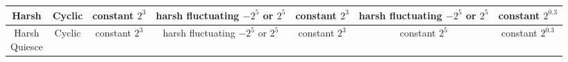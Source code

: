 \documentclass[PhD]{msu-thesis}
\begin{document}
\begin{table}[]
\begin{tabular}{|c|c||c|c||c|c|c|}
	Harsh & Cyclic & \makecell{constant \\ $2^3$} & \makecell{harsh \\ fluctuating \\ $-2^5$ or $2^5$} & \makecell{constant \\ $2^3$} & \makecell{harsh \\ fluctuating \\ $-2^5$ or $2^5$} & \makecell{constant \\ $2^{0.3}$} \\\hline
	\makecell{Harsh \\ Quiesce} & Cyclic & \makecell{constant \\ $2^3$} & \makecell{harsh \\ fluctuating \\ $-2^5$ or $2^5$} & \makecell{constant \\ $2^3$} & \makecell{constant \\ $2^5$} & \makecell{constant \\ $2^{0.3}$} \\\hline


\end{tabular}
\end{table}
\end{document}
